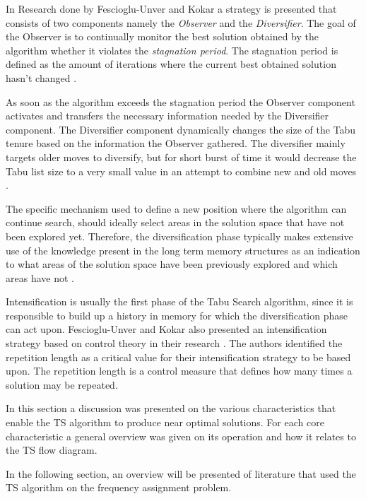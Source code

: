 In Research done by Fescioglu-Unver and Kokar \cite{SelfControllingReactiveTabu} a strategy is presented that consists of two components namely the \emph{Observer} and the \emph{Diversifier}. The goal of the Observer is to continually monitor the best solution obtained by the algorithm whether it violates the \emph{stagnation period}. The stagnation period is defined as the amount of iterations where the current best obtained solution hasn't changed \cite{SelfControllingReactiveTabu}. 

As soon as the algorithm exceeds the stagnation period the Observer component activates and transfers the necessary information needed by the Diversifier component. The Diversifier component dynamically changes the size of the Tabu tenure based on the information the Observer gathered. The diversifier mainly targets older moves to diversify, but for short burst of time it would decrease the Tabu list size to a very small value in an attempt to combine new and old moves \cite{SelfControllingReactiveTabu}.

The specific mechanism used to define a new position where the algorithm can continue search, should ideally select areas in the solution space that have not been explored yet. Therefore, the diversification phase typically makes extensive use of the knowledge present in the long term memory structures as an indication to what areas of the solution space have been previously explored and which areas have not \cite{TabuParameterization,TabuCrewSchedulingProblem,NonlinearGlobalTabu,SelfControllingReactiveTabu}.

Intensification is usually the first phase of the Tabu Search algorithm, since it is responsible to build up a history in memory for which the diversification phase can act upon. Fescioglu-Unver and Kokar also presented an intensification strategy based on control theory in their research \cite{SelfControllingReactiveTabu}. The authors identified the repetition length as a critical value for their intensification strategy to be based upon. The repetition length is a control measure that defines how many times a solution may be repeated.

In this section a discussion was presented on the various characteristics that enable the TS algorithm to produce near optimal solutions. For each core characteristic a general overview was given on its operation and how it relates to the TS flow diagram.

In the following section, an overview will be presented of literature that used the TS algorithm on the frequency assignment problem.
